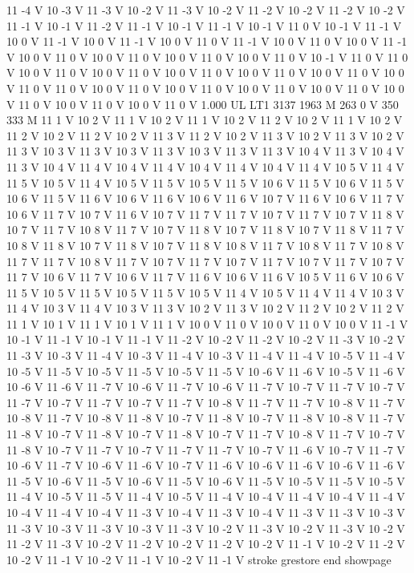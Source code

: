 {11 -4 V
10 -3 V
11 -3 V
10 -2 V
11 -3 V
10 -2 V
11 -2 V
10 -2 V
11 -2 V
10 -2 V
11 -1 V
10 -1 V
11 -2 V
11 -1 V
10 -1 V
11 -1 V
10 -1 V
11 0 V
10 -1 V
11 -1 V
10 0 V
11 -1 V
10 0 V
11 -1 V
10 0 V
11 0 V
11 -1 V
10 0 V
11 0 V
10 0 V
11 -1 V
10 0 V
11 0 V
10 0 V
11 0 V
10 0 V
11 0 V
10 0 V
11 0 V
10 -1 V
11 0 V
11 0 V
10 0 V
11 0 V
10 0 V
11 0 V
10 0 V
11 0 V
10 0 V
11 0 V
10 0 V
11 0 V
10 0 V
11 0 V
11 0 V
10 0 V
11 0 V
10 0 V
11 0 V
10 0 V
11 0 V
10 0 V
11 0 V
10 0 V
11 0 V
10 0 V
11 0 V
10 0 V
11 0 V
1.000 UL
LT1
3137 1963 M
263 0 V
350 333 M
11 1 V
10 2 V
11 1 V
10 2 V
11 1 V
10 2 V
11 2 V
10 2 V
11 1 V
10 2 V
11 2 V
10 2 V
11 2 V
10 2 V
11 3 V
11 2 V
10 2 V
11 3 V
10 2 V
11 3 V
10 2 V
11 3 V
10 3 V
11 3 V
10 3 V
11 3 V
10 3 V
11 3 V
11 3 V
10 4 V
11 3 V
10 4 V
11 3 V
10 4 V
11 4 V
10 4 V
11 4 V
10 4 V
11 4 V
10 4 V
11 4 V
10 5 V
11 4 V
11 5 V
10 5 V
11 4 V
10 5 V
11 5 V
10 5 V
11 5 V
10 6 V
11 5 V
10 6 V
11 5 V
10 6 V
11 5 V
11 6 V
10 6 V
11 6 V
10 6 V
11 6 V
10 7 V
11 6 V
10 6 V
11 7 V
10 6 V
11 7 V
10 7 V
11 6 V
10 7 V
11 7 V
11 7 V
10 7 V
11 7 V
10 7 V
11 8 V
10 7 V
11 7 V
10 8 V
11 7 V
10 7 V
11 8 V
10 7 V
11 8 V
10 7 V
11 8 V
11 7 V
10 8 V
11 8 V
10 7 V
11 8 V
10 7 V
11 8 V
10 8 V
11 7 V
10 8 V
11 7 V
10 8 V
11 7 V
11 7 V
10 8 V
11 7 V
10 7 V
11 7 V
10 7 V
11 7 V
10 7 V
11 7 V
10 7 V
11 7 V
10 6 V
11 7 V
10 6 V
11 7 V
11 6 V
10 6 V
11 6 V
10 5 V
11 6 V
10 6 V
11 5 V
10 5 V
11 5 V
10 5 V
11 5 V
10 5 V
11 4 V
10 5 V
11 4 V
11 4 V
10 3 V
11 4 V
10 3 V
11 4 V
10 3 V
11 3 V
10 2 V
11 3 V
10 2 V
11 2 V
10 2 V
11 2 V
11 1 V
10 1 V
11 1 V
10 1 V
11 1 V
10 0 V
11 0 V
10 0 V
11 0 V
10 0 V
11 -1 V
10 -1 V
11 -1 V
10 -1 V
11 -1 V
11 -2 V
10 -2 V
11 -2 V
10 -2 V
11 -3 V
10 -2 V
11 -3 V
10 -3 V
11 -4 V
10 -3 V
11 -4 V
10 -3 V
11 -4 V
11 -4 V
10 -5 V
11 -4 V
10 -5 V
11 -5 V
10 -5 V
11 -5 V
10 -5 V
11 -5 V
10 -6 V
11 -6 V
10 -5 V
11 -6 V
10 -6 V
11 -6 V
11 -7 V
10 -6 V
11 -7 V
10 -6 V
11 -7 V
10 -7 V
11 -7 V
10 -7 V
11 -7 V
10 -7 V
11 -7 V
10 -7 V
11 -7 V
10 -8 V
11 -7 V
11 -7 V
10 -8 V
11 -7 V
10 -8 V
11 -7 V
10 -8 V
11 -8 V
10 -7 V
11 -8 V
10 -7 V
11 -8 V
10 -8 V
11 -7 V
11 -8 V
10 -7 V
11 -8 V
10 -7 V
11 -8 V
10 -7 V
11 -7 V
10 -8 V
11 -7 V
10 -7 V
11 -8 V
10 -7 V
11 -7 V
10 -7 V
11 -7 V
11 -7 V
10 -7 V
11 -6 V
10 -7 V
11 -7 V
10 -6 V
11 -7 V
10 -6 V
11 -6 V
10 -7 V
11 -6 V
10 -6 V
11 -6 V
10 -6 V
11 -6 V
11 -5 V
10 -6 V
11 -5 V
10 -6 V
11 -5 V
10 -6 V
11 -5 V
10 -5 V
11 -5 V
10 -5 V
11 -4 V
10 -5 V
11 -5 V
11 -4 V
10 -5 V
11 -4 V
10 -4 V
11 -4 V
10 -4 V
11 -4 V
10 -4 V
11 -4 V
10 -4 V
11 -3 V
10 -4 V
11 -3 V
10 -4 V
11 -3 V
11 -3 V
10 -3 V
11 -3 V
10 -3 V
11 -3 V
10 -3 V
11 -3 V
10 -2 V
11 -3 V
10 -2 V
11 -3 V
10 -2 V
11 -2 V
11 -3 V
10 -2 V
11 -2 V
10 -2 V
11 -2 V
10 -2 V
11 -1 V
10 -2 V
11 -2 V
10 -2 V
11 -1 V
10 -2 V
11 -1 V
10 -2 V
11 -1 V
stroke
grestore
end
showpage
}
